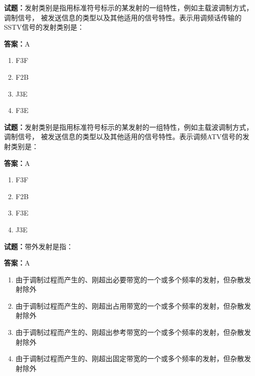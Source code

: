 \documentclass{ctexbook}
\begin{document}




\vspace{1em}

\textbf{试题：}发射类别是指用标准符号标示的某发射的一组特性，例如主载波调制方式，调制信号，
被发送信息的类型以及其他适用的信号特性。表示用调频话传输的SSTV信号的发射类别是： 

\textbf{答案：}A 

\begin{enumerate}[leftmargin=3em]
  \item F3F 

  \item F2B 

  \item J3E 

  \item F3E 

\end{enumerate}





\vspace{1em}

\textbf{试题：}发射类别是指用标准符号标示的某发射的一组特性，例如主载波调制方式，调制信号，
被发送信息的类型以及其他适用的信号特性。表示调频ATV信号的发射类别是： 

\textbf{答案：}A 

\begin{enumerate}[leftmargin=3em]
  \item F3F 

  \item F2B 

  \item F3E 

  \item J3E 

\end{enumerate}





\vspace{1em}

\textbf{试题：}带外发射是指： 

\textbf{答案：}A 

\begin{enumerate}[leftmargin=3em]
  \item 由于调制过程而产生的、刚超出必要带宽的一个或多个频率的发射，但杂散发射除外 

  \item 由于调制过程而产生的、刚超出占用带宽的一个或多个频率的发射，但杂散发射除外 

  \item 由于调制过程而产生的、刚超出参考带宽的一个或多个频率的发射，但杂散发射除外 


  \item 由于调制过程而产生的、刚超出固定带宽的一个或多个频率的发射，但杂散发射除外 

\end{enumerate}
\end{document}
